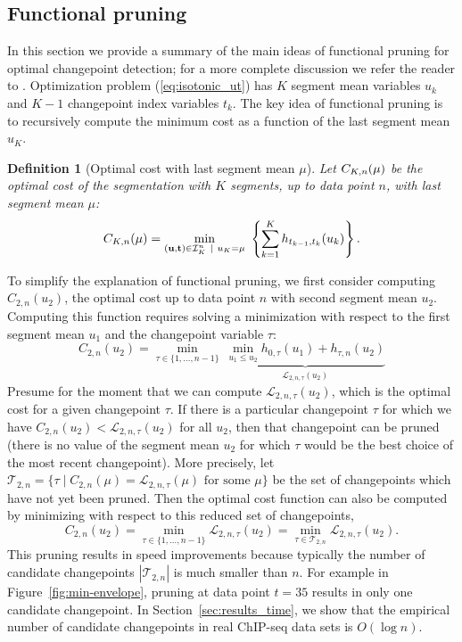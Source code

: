 \documentclass[aoas]{imsart}
\newtheorem{definition}{Definition}
\begin{document}
\subsection{Functional pruning}
\label{sec:functional-pruning}

In this section we provide a summary of the main ideas of functional
pruning for optimal changepoint detection; for a more complete
discussion we refer the reader to \citep{fpop}. Optimization problem
(\ref{eq:isotonic_ut}) has $K$ segment mean variables $u_k$ and $K-1$
changepoint index variables $t_k$. The key idea of functional pruning
is to recursively compute the minimum cost as a function of the last
segment mean $u_K$.

\begin{definition}[Optimal cost with last segment mean $\mu$]
\label{def:fcc}
  Let $C_{K,n}(\mu)$ be the optimal cost of the segmentation
  with $K$ segments, up to data point $n$, with last segment mean
  $\mu$:
\begin{equation}
\FCC_{K,n}(\mu) = \min_{(\mathbf u, \mathbf t)\in{\mathcal I}^n_K \ | \ u_K = \mu} \
  \left\{ \sum_{k=1}^K
  h_{t_{k-1}, t_k}(u_k) \right\}.
\end{equation}
\end{definition}

To simplify the explanation of functional pruning, we first consider
computing $C_{2,n}(u_2)$, the optimal cost up to data point $n$ with
second segment mean $u_2$. Computing this function requires solving a
minimization with respect to the first segment mean $u_1$ and the
changepoint variable $\tau$:
\begin{equation}
  C_{2,n}(u_2) = 
\min_{\tau\in\{1,\dots,n-1\}}
\ 
\underbrace{\min_{u_1\leq u_2}
  h_{0,\tau}(u_1) +
h_{\tau, n}(u_2)}_{\mathcal L_{2,n,\tau}(u_2)}
\end{equation}
Presume for the moment that we can compute
$\mathcal L_{2,n,\tau}(u_2)$, which is the optimal cost for a given
changepoint $\tau$. If there is a particular changepoint $\tau$ for
which we have $C_{2,n}(u_2)<\mathcal L_{2,n,\tau}(u_2)$ for all $u_2$,
then that changepoint can be pruned (there is no value of the segment
mean $u_2$ for which $\tau$ would be the best choice of the most
recent changepoint). More precisely, let
$\mathcal T_{2,n}=\{ \tau\mid C_{2,n}(\mu)=\mathcal L_{2,n,\tau}(\mu)
\text{ for some $\mu$} \}$ be the set of changepoints which have not
yet been pruned.  Then the optimal cost function can also be computed
by minimizing with respect to this reduced set of changepoints,
\begin{equation}
  C_{2,n}(u_2) = 
\min_{\tau\in\{1,\dots,n-1\}}
\mathcal L_{2,n,\tau}(u_2)
=
\min_{\tau\in\mathcal T_{2,n}}
\mathcal L_{2,n,\tau}(u_2).
\end{equation}
This pruning results in speed improvements because typically the
number of candidate changepoints $|\mathcal T_{2,n}|$ is much smaller
than $n$. For example in Figure~\ref{fig:min-envelope}, pruning at
data point $t=35$ results in only one candidate changepoint. In
Section~\ref{sec:results_time}, we show that the empirical number of
candidate changepoints in real ChIP-seq data sets is $O(\log n)$.
\end{document}
